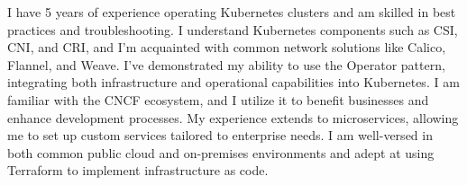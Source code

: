 

\begin{cvparagraph}

I have 5 years of experience operating Kubernetes clusters and am skilled in best practices and troubleshooting. I understand Kubernetes components such as CSI, CNI, and CRI, and I'm acquainted with common network solutions like Calico, Flannel, and Weave. I've demonstrated my ability to use the Operator pattern, integrating both infrastructure and operational capabilities into Kubernetes. I am familiar with the CNCF ecosystem, and I utilize it to benefit businesses and enhance development processes. My experience extends to microservices, allowing me to set up custom services tailored to enterprise needs. I am well-versed in both common public cloud and on-premises environments and adept at using Terraform to implement infrastructure as code.

\end{cvparagraph}
